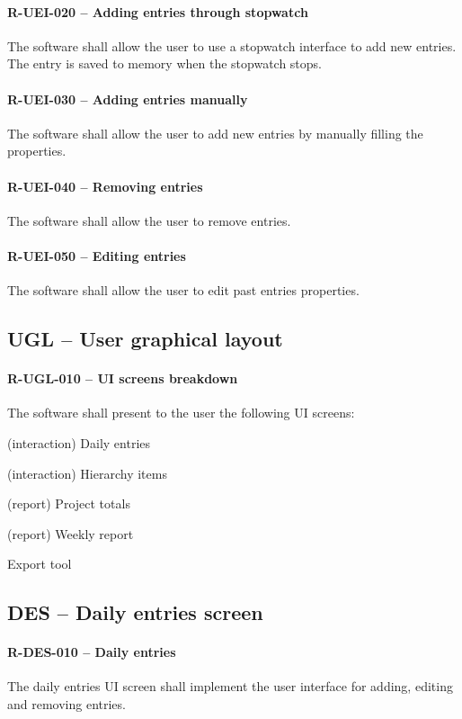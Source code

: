 \paragraph{R-UEI-020 -- Adding entries through stopwatch}
The software shall allow the user to use a stopwatch interface to
add new entries. The entry is saved to memory when the stopwatch stops.

\paragraph{R-UEI-030 -- Adding entries manually}
The software shall allow the user to add new entries by manually filling
the properties.

\paragraph{R-UEI-040 -- Removing entries}
The software shall allow the user to remove entries.

\paragraph{R-UEI-050 -- Editing entries}
The software shall allow the user to edit past entries properties.

\subsection{UGL -- User graphical layout}
\paragraph{R-UGL-010 -- UI screens breakdown}
The software shall present to the user the following UI screens:

\begin{compactitem}
\item (interaction) Daily entries
\item (interaction) Hierarchy items
\item (report) Project totals
\item (report) Weekly report
\item Export tool
\end{compactitem}

\subsection{DES -- Daily entries screen}
\paragraph{R-DES-010 -- Daily entries}
The daily entries UI screen shall implement the user interface for adding,
editing and removing entries.

